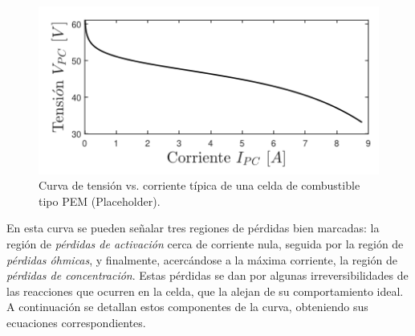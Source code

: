 \begin{figure}[H]
    \centering
    \includegraphics[scale=0.7]{Imagenes/Curva V-I Celda.png}
    \caption{Curva de tensión vs. corriente típica de una celda de combustible tipo PEM (Placeholder).}
    \label{V-I_celda}
\end{figure}

En esta curva se pueden señalar tres regiones de pérdidas bien marcadas: la región de \textit{pérdidas de activación} cerca de corriente nula, seguida por la región de \textit{pérdidas óhmicas}, y finalmente, acercándose a la máxima corriente, la región de \textit{pérdidas de concentración}. Estas pérdidas se dan por algunas irreversibilidades de las reacciones que ocurren en la celda, que la alejan de su comportamiento ideal. A continuación se detallan estos componentes de la curva, obteniendo sus ecuaciones correspondientes.\\

